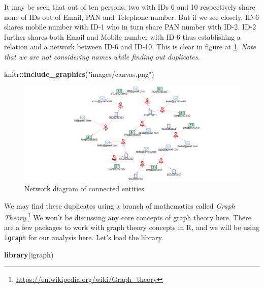 \documentclass[
]{book}
\newenvironment{Shaded}{\begin{snugshade}}{\end{snugshade}}
\newcommand{\FunctionTok}[1]{\textcolor[rgb]{0.13,0.29,0.53}{\textbf{#1}}}
\newcommand{\NormalTok}[1]{#1}
\newcommand{\SpecialCharTok}[1]{\textcolor[rgb]{0.81,0.36,0.00}{\textbf{#1}}}
\newcommand{\StringTok}[1]{\textcolor[rgb]{0.31,0.60,0.02}{#1}}
\begin{document}
It may be seen that out of ten persons, two with IDs 6 and 10 respectively share none of IDs out of Email, PAN and Telephone number. But if we see closely, ID-6 shares mobile number with ID-1 who in turn share PAN number with ID-2. ID-2 further shares both Email and Mobile number with ID-6 thus establishing a relation and a network between ID-6 and ID-10. This is clear in figure at \ref{fig:igraph11}. \emph{Note that we are not considering names while finding out duplicates.}

\begin{Shaded}
\begin{Highlighting}[]
\NormalTok{knitr}\SpecialCharTok{::}\FunctionTok{include\_graphics}\NormalTok{(}\StringTok{"images/canvas.png"}\NormalTok{)}
\end{Highlighting}
\end{Shaded}

\begin{figure}

{\centering \includegraphics[width=0.75\linewidth]{images/canvas} 

}

\caption{Network diagram of connected entities}\label{fig:igraph11}
\end{figure}

We may find these duplicates using a branch of mathematics called \emph{Graph Theory}.\footnote{\url{https://en.wikipedia.org/wiki/Graph_theory}} We won't be discussing any core concepts of graph theory here. There are a few packages to work with graph theory concepts in R, and we will be using \texttt{igraph} \citep{R-igraph} for our analysis here. Let's load the library.

\begin{Shaded}
\begin{Highlighting}[]
\FunctionTok{library}\NormalTok{(igraph)}
\end{Highlighting}
\end{Shaded}
\end{document}
